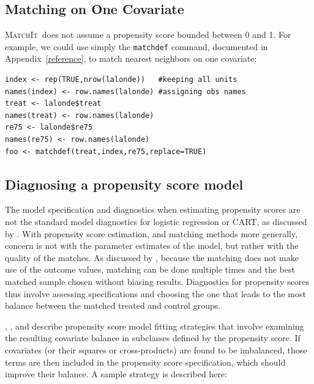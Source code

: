\documentclass[oneside,letterpaper,titlepage]{article}
\newcommand{\MatchIt}{\textsc{MatchIt}}
\begin{document}
\subsection{Matching on One Covariate}
\MatchIt\ does not assume a propensity score bounded between 0 and 1.
For example, we could use simply the \texttt{matchdef} command,
documented in Appendix~\ref{reference}, to match nearest neighbors on
one covariate:

\begin{verbatim}
index <- rep(TRUE,nrow(lalonde))   #keeping all units
names(index) <- row.names(lalonde) #assigning obs names
treat <- lalonde$treat
names(treat) <- row.names(lalonde)
re75 <- lalonde$re75
names(re75) <- row.names(lalonde)
foo <- matchdef(treat,index,re75,replace=TRUE)
\end{verbatim}

\subsection{Diagnosing a propensity score model}
\label{pscorespec}
The model specification and diagnostics when estimating propensity
scores are not the standard model diagnostics for logistic regression
or CART, as discussed by \cite{Rubin04}.  With propensity score
estimation, and matching methods more generally, concern is not with
the parameter estimates of the model, but rather with the quality of
the matches.  As discussed by \cite{Greevy04}, because the matching
does not make use of the outcome values, matching can be done multiple
times and the best matched sample chosen without biasing results.
Diagnostics for propensity scores thus involve assessing
specifications and choosing the one that leads to the most balance
between the matched treated and control groups.

\cite{RosRub84a}, \cite{Perkins00}, and \cite{DehWah02} describe
propensity score model fitting strategies that involve examining the
resulting covariate balance in subclasses defined by the propensity
score.  If covariates (or their squares or cross-products) are found
to be imbalanced, those terms are then included in the propensity
score specification, which should improve their balance.  A sample
strategy is described here:
\end{document}
